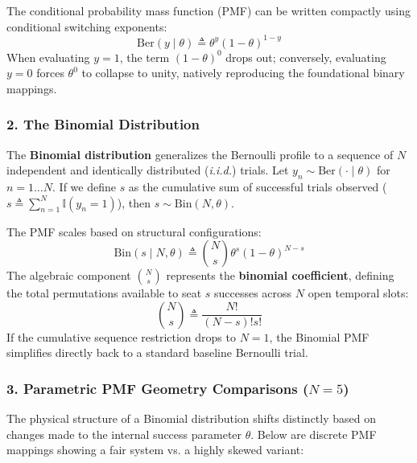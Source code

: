 \documentclass{article}
\begin{document}
\noindent The conditional probability mass function (PMF) can be written compactly using conditional switching exponents:
\begin{equation}
    \text{Ber}(y \mid \theta) \triangleq \theta^y (1 - \theta)^{1-y}
\end{equation}
When evaluating $y=1$, the term $(1-\theta)^0$ drops out; conversely, evaluating $y=0$ forces $\theta^0$ to collapse to unity, natively reproducing the foundational binary mappings.

\subsubsection*{2. The Binomial Distribution}
The \textbf{Binomial distribution} generalizes the Bernoulli profile to a sequence of $N$ independent and identically distributed (\textit{i.i.d.}) trials. Let $y_n \sim \text{Ber}(\cdot \mid \theta)$ for $n=1 \dots N$. If we define $s$ as the cumulative sum of successful trials observed ($s \triangleq \sum_{n=1}^N \mathbb{I}(y_n = 1)$), then $s \sim \text{Bin}(N, \theta)$. 

The PMF scales based on structural configurations:
\begin{equation}
    \text{Bin}(s \mid N, \theta) \triangleq \binom{N}{s} \theta^s (1 - \theta)^{N-s}
\end{equation}
The algebraic component $\binom{N}{s}$ represents the \textbf{binomial coefficient}, defining the total permutations available to seat $s$ successes across $N$ open temporal slots:
\begin{equation}
    \binom{N}{s} \triangleq \frac{N!}{(N - s)!s!}
\end{equation}
If the cumulative sequence restriction drops to $N=1$, the Binomial PMF simplifies directly back to a standard baseline Bernoulli trial.

\subsubsection*{3. Parametric PMF Geometry Comparisons ($N=5$)}
The physical structure of a Binomial distribution shifts distinctly based on changes made to the internal success parameter $\theta$. Below are discrete PMF mappings showing a fair system vs. a highly skewed variant:
\end{document}
